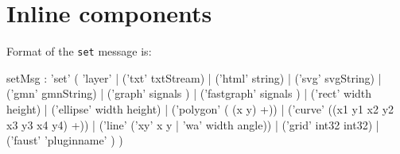 \documentclass[a4paper,twoside]{report}
\newcommand{\sublevel}[1]	{\section{#1}}
\newcommand{\OSC}[1]		{\texttt{#1}}
\begin{document}
\sublevel{Inline components}
\label{inlineset}

Format of the \OSC{set} message is:
\begin{rail}
setMsg : 'set' (
	'layer'  |
	('txt' txtStream) |
	('html' string) |
	('svg' svgString) |
	('gmn' gmnString) |
	('graph' signals ) |
	('fastgraph' signals ) |
	('rect' width height) |
	('ellipse' width height) |
	('polygon' ( (x y) +)) |
	('curve' ((x1 y1 x2 y2 x3 y3 x4 y4) +)) |
	('line' ('xy' x y | 'wa' width angle)) |
	('grid' int32 int32) |
	('faust' 'pluginname' )
)
\end{rail}
\end{document}
